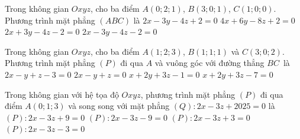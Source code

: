 \begin{ex}%
	Trong không gian $Oxyz$, cho  ba điểm $A(0;2;1)$, $B(3;0;1)$, $C(1;0;0)$. Phương trình mặt phẳng $(ABC)$ là
	 \choice
		 {$2x-3y-4z+2=0$}
		 {$4x+6y-8z+2=0$}
		{\True  $2x+3y-4z-2=0$}
		{$2x-3y-4z-2=0$} 
\end{ex}

\begin{ex}%
	Trong không gian $Oxyz$, cho ba điểm  ${A}\left(1;2;3\right)$, ${B}\left(1;1;1\right)$ và ${C}\left(3;0;2\right)$. Phương trình mặt phẳng $\left({P}\right)$ đi qua $A$ và vuông góc với đường thẳng $BC$~là
	\choice 
		{\True  $ 2x-y+z-3=0$}
		{$  2x-y+z=0$}
		{$ x+2y+3z-1=0$} 
		{$ x+2y+3z-7=0$} 
\end{ex}

\begin{ex}%
	Trong không gian với hệ  tọa độ $Oxyz$, phương trình mặt phẳng $(P)$ đi qua điểm $A(0;1;3)$ và song song với mặt phẳng $(Q)\colon 2x - 3z + 2025 = 0$ là
	\choice 
		{\True $(P)\colon 2x - 3z + 9  = 0$}
		 {$(P)\colon 2x - 3z - 9 = 0$}
		{$(P)\colon 2x - 3z  + 3 = 0$}
		{$(P)\colon 2x  - 3z - 3 = 0$}
\end{ex}

